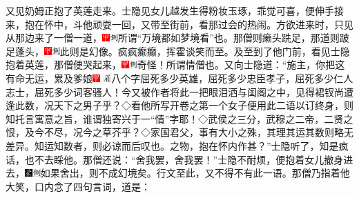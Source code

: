 又见奶姆正抱了英莲走来。士隐见女儿越发生得粉妆玉琢，乖觉可喜，便伸手接来，抱在怀中，斗他顽耍一回，又带至街前，看那过会的热闹。方欲进来时，只见从那边来了一僧一道，{\includegraphics[width=3mm]{../Images/00002}\includegraphics[width=3mm]{../Images/00011}\footnotesize 所谓``万境都如梦境看''也。}那僧则癞头跣足，那道则跛足蓬头，{\includegraphics[width=3mm]{../Images/00002}\includegraphics[width=3mm]{../Images/00011}\footnotesize 此则是幻像。}疯疯癫癫，挥霍谈笑而至。及至到了他门前，看见士隐抱着英莲，那僧便哭起来，{\includegraphics[width=3mm]{../Images/00002}\includegraphics[width=3mm]{../Images/00011}\footnotesize 奇怪！所谓情僧也。}又向士隐道：``施主，你把这有命无运，累及爹娘{\includegraphics[width=3mm]{../Images/00002} \includegraphics[width=3mm]{../Images/00010}\footnotesize  八个字屈死多少英雄，屈死多少忠臣孝子，屈死多少仁人志士，屈死多少词客骚人！今又被作者将此一把眼泪洒与闺阁之中，见得裙钗尚遭逢此数，况天下之男子乎？◇看他所写开卷之第一个女子便用此二语以订终身，则知托言寓意之旨，谁谓独寄兴于一``情''字耶！◇武侯之三分，武穆之二帝，二贤之恨，及今不尽，况今之草芥乎？◇家国君父，事有大小之殊，其理其运其数则略无差异。知运知数者，则必谅而后叹也。}之物，抱在怀内作甚？''士隐听了，知是疯话，也不去睬他。那僧还说：``舍我罢，舍我罢！''士隐不耐烦，便抱着女儿撤身进去，{\includegraphics[width=3mm]{../Images/00006}\includegraphics[width=3mm]{../Images/00011}\footnotesize 如果舍出，则不成幻境矣。行文至此，又不得不有此一语。}那僧乃指着他大笑，口内念了四句言词，道是：

